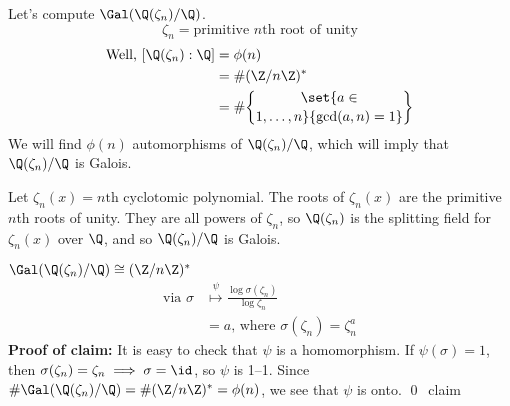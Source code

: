 Let's compute $\Gal(\Q(\zeta_n)/\Q)$.
\[ \zeta_n=\text{primitive $n$th root of unity} \]
\begin{align*}
\text{Well, } [\Q(\zeta_n):\Q] &= \phi(n) \\
&= \#(\Z/n\Z)^* \\
&= \#\set{a\in\brace{1,\dotsc,n}}{\gcd(a,n)=1}
\end{align*}
We will find $\phi(n)$ automorphisms of $\Q(\zeta_n)/\Q$, which will imply that $\Q(\zeta_n)/\Q$ is Galois.

Let $\zeta_n(x)=\text{$n$th cyclotomic polynomial}$.  The roots of $\zeta_n(x)$ are the primitive $n$th roots of unity.  They are all powers of $\zeta_n$, so $\Q(\zeta_n)$ is the splitting field for $\zeta_n(x)$ over $\Q$, and so $\Q(\zeta_n)/\Q$ is Galois.

\claim $\Gal(\Q(\zeta_n)/\Q)\cong(\Z/n\Z)^*$ %
\begin{align*}
\text{via } \sigma &\stackrel\psi\mapsto \frac{\log\sigma(\zeta_n)}{\log\zeta_n} \\
&= a\text{, where $\sigma(\zeta_n)=\zeta_n^a$}
\end{align*}
\textbf{Proof of claim: }It is easy to check that $\psi$ is a homomorphism.  If $\psi(\sigma)=1$, then $\sigma(\zeta_n)=\zeta_n\implies\sigma=\id$, so $\psi$ is 1--1.  Since $\#\Gal(\Q(\zeta_n)/\Q)=\#(\Z/n\Z)^*=\phi(n)$, we see that $\psi$ is onto. \qed\ claim
